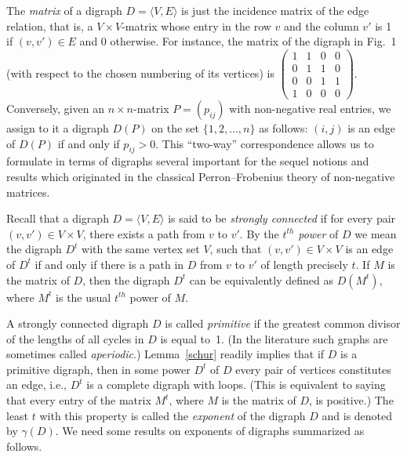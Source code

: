 \documentclass[11pt]{llncs}
\begin{document}
The \emph{matrix} of a digraph $D=\langle V,E\rangle$ is just the incidence
matrix of the edge relation, that is, a $V\times V$-matrix whose entry in
the row $v$ and the column $v'$ is 1 if $(v,v')\in E$ and 0 otherwise. For
instance, the matrix of the digraph in Fig.~1 (with respect to the chosen
numbering of its vertices) is $\left(\begin{smallmatrix}1&1&0&0\\
0&1&1&0\\ 0&0&1&1\\ 1&0&0&0 \end{smallmatrix}\right)$. Conversely, given
an $n\times n$-matrix $P=(p_{ij})$ with non-negative real entries, we assign
to it a digraph $D(P)$ on the set $\{1,2,\dots,n\}$ as follows: $(i,j)$ is an
edge of $D(P)$ if and only if $p_{ij}>0$. This ``two-way'' correspondence
allows us to formulate in terms of digraphs several important for the sequel
notions and results which originated in the classical Perron--Frobenius theory
of non-negative matrices.

Recall that a digraph $D=\langle V,E\rangle$ is said to be \emph{strongly
connected} if for every pair $(v,v')\in V\times V$, there exists a path
from $v$ to $v'$. By the $t^{th}$ \emph{power}
of $D$ we mean the digraph $D^t$ with the same vertex set $V$, such that
$(v,v')\in V\times V$ is an edge of $D^t$ if and only if there is a path
in $D$ from $v$ to $v'$ of length precisely $t$. If $M$ is the matrix of $D$,
then the digraph $D^t$ can be equivalently defined as $D(M^t)$, where
$M^t$ is the usual $t^{th}$ power of $M$.

A strongly connected digraph $D$ is called \emph{primitive} if the greatest
common divisor of the lengths of all cycles in $D$ is equal to~1. (In the
literature such graphs are sometimes called \emph{aperiodic}.)
Lemma~\ref{schur} readily implies that if $D$ is a primitive digraph, then
in some power $D^t$ of $D$ every pair of vertices constitutes an edge, i.e.,
$D^t$ is a complete digraph with loops. (This is equivalent to saying that
every entry of the matrix $M^t$, where $M$ is the matrix of $D$, is positive.)
The least $t$ with this property is called the \emph{exponent} of the digraph $D$
and is denoted by $\gamma(D)$. We need some results on exponents of digraphs
summarized as follows.
\end{document}
